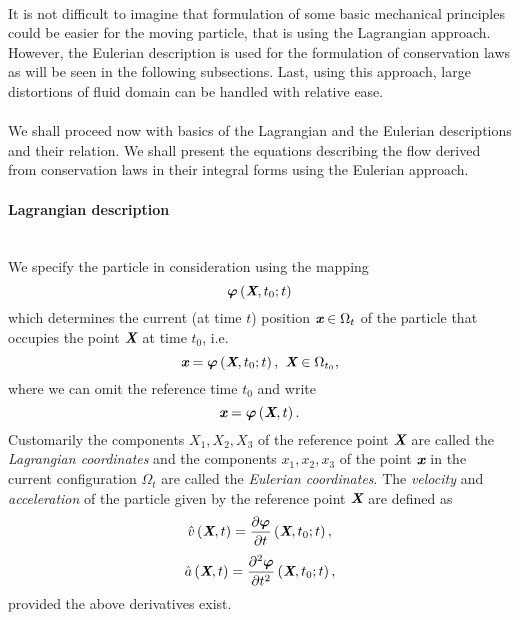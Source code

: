 \paragraph{}
It is not difficult to imagine that formulation of some basic mechanical principles could be easier for the moving particle, that is using the Lagrangian approach.
However, the Eulerian description is used for the formulation of conservation laws as will be seen in the following subsections.
Last, using this approach, large distortions of fluid domain can be handled with relative ease.
\paragraph{}
We shall proceed now with basics of the Lagrangian and the Eulerian descriptions and their relation. We shall present the equations describing the flow derived from conservation laws in their integral forms using the Eulerian approach.
\paragraph{Lagrangian description}\ \\
We specify the particle in consideration using the mapping 
\begin{equation}\label{phi_def}
\boldsymbol{\varphi}\left(\textit{\textbf{X}},t_0;t\right)
\end{equation} 
which determines the current (at time $t$) position $\textit{\textbf{x}}\in\Omega_t$ of the particle that occupies the point $\textit{\textbf{X}}$ at time $t_0$, i.e.
\begin{equation}\textit{\textbf{x}} = \boldsymbol{\varphi}\left(\textit{\textbf{X}},t_0;t\right),\ \textit{\textbf{X}}\in\Omega_{t_0},
\end{equation}
where we can omit the reference time $t_0 $ and write
\begin{equation}\label{x=phi}
\textit{\textbf{x}} = \boldsymbol{\varphi}\left(\textit{\textbf{X}},t\right).
\end{equation}
Customarily the components $X_1,X_2,X_3$ of the reference point $\textit{\textbf{X}}$ are called the \textit{Lagrangian coordinates} and the components
$x_1,x_2,x_3$ of the point $\textit{\textbf{x}}$ in the current configuration $\Omega_t$ are called the \textit{Eulerian coordinates}. The \textit{velocity} and \textit{acceleration} of the particle given by the reference point $\textit{\textbf{X}}$ are defined as
\begin{equation}\label{v_def}
\hat{v}\left(\textit{\textbf{X}},t\right) = \frac{\partial{\boldsymbol{\varphi}}}{\partial{t}}\left(\textit{\textbf{X}},t_0;t\right),
\end{equation}
\begin{equation}
\hat{a}\left(\textit{\textbf{X}},t\right) = \frac{\partial^2{\boldsymbol{\varphi}}}{\partial{t}^2}\left(\textit{\textbf{X}},t_0;t\right),
\end{equation}
provided the above derivatives exist.
